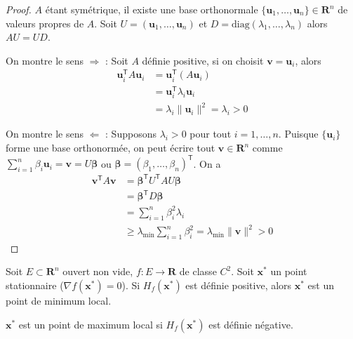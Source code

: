 \begin{proof}
$A$ étant symétrique, il existe une base orthonormale $\{\boldsymbol{u}_{1},\dots,\boldsymbol{u}_{n} \}\in \mathbf{R}^{n}$ de valeurs propres de $A$. Soit $U=(\boldsymbol{u}_{1},\dots,\boldsymbol{u}_{n})$ et $D=\mathrm{diag}(\lambda_{1},\dots,\lambda _{n})$ alors $AU=UD$. 

On montre le sens $\Rightarrow$ : Soit $A$ définie positive, si on choisit $\boldsymbol{v}=\boldsymbol{u}_{i}$, alors
\begin{align*}
\boldsymbol{u}_{i}^{\mathsf{T}}A\boldsymbol{u}_{i} & =\boldsymbol{u}_{i}^{\mathsf{T}}(A\boldsymbol{u}_{i}) \\
 & =\boldsymbol{u}_{i}^{\mathsf{T}} \lambda _{i}\boldsymbol{u}_{i} \\
 & =\lambda _{i}\lVert \boldsymbol{u}_{i} \rVert^{2}=\lambda _{i}>0 
\end{align*}

On montre le sens $\Leftarrow$ : Supposons $\lambda _{i}>0$ pour tout $i=1,\dots,n$. Puisque $\{ \boldsymbol{u}_{i} \}$ forme une base orthonormée, on peut écrire tout $\boldsymbol{v}\in \mathbf{R}^{n}$ comme $\sum _{i=1}^{n}\beta _{i}\boldsymbol{u}_{i}=\boldsymbol{v}=U\boldsymbol{\beta}$ ou $\boldsymbol{\beta}=(\beta_{1},\dots,\beta _{n})^{\mathsf{T}}$. On a 
\begin{align*}
\boldsymbol{v}^{\mathsf{T}} A\boldsymbol{v} & =\boldsymbol{\beta}^{\mathsf{T}}U^{\mathsf{T}} AU\boldsymbol{\beta} \\
 & =\boldsymbol{\beta}^{\mathsf{T}}D\boldsymbol{\beta} \\
 &=\sum_{i=1}^{n} \beta_{i}^{2}\lambda _{i} \\
 & \ge \lambda _{\mathrm{min}}\sum_{i=1}^{n} \beta _{i}^{2}=\lambda _{\mathrm{min}}\lVert \boldsymbol{v} \rVert ^{2}>0
\end{align*}
\end{proof}
\begin{theorem}
Soit $E\subset \mathbf{R}^{n}$ ouvert non vide, $f:E\to \mathbf{R}$ de classe $C^{2}$. Soit $\boldsymbol{x}^{*}$ un point stationnaire ($\nabla f(\boldsymbol{x}^{*})=0$). Si $H_{f}(\boldsymbol{x}^{*})$ est définie positive, alors $\boldsymbol{x}^{*}$ est un point de minimum local.

$\boldsymbol{x}^{*}$ est un point de maximum local si $H_{f}(\boldsymbol{x}^{*})$ est définie négative.
\end{theorem}

